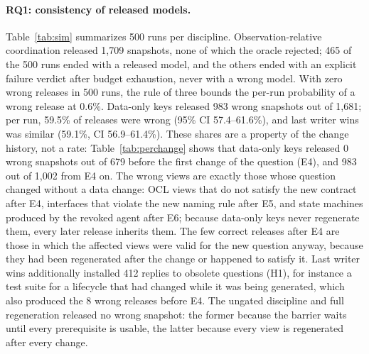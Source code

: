 \documentclass[pdflatex,sn-mathphys-num]{sn-jnl}
\theoremstyle{thmstyleone}%
\theoremstyle{thmstyletwo}%
\theoremstyle{thmstylethree}%
\newcommand{\SimRuns}{500}
\newcommand{\SimExactReleases}{1,709}
\newcommand{\SimDataWrong}{983}
\newcommand{\SimDataReleases}{1,681}
\newcommand{\SimLwwObsolete}{412}
\newcommand{\SimExactFinal}{465}
\newcommand{\SimDataShare}{59.5}
\newcommand{\SimDataShareLo}{57.4}
\newcommand{\SimDataShareHi}{61.6}
\newcommand{\SimLwwShare}{59.1}
\newcommand{\SimLwwShareLo}{56.9}
\newcommand{\SimLwwShareHi}{61.4}
\newcommand{\SimExactBound}{0.6}
\newcommand{\SimDataPreRel}{679}
\newcommand{\SimDataPreWrong}{0}
\newcommand{\SimDataPostRel}{1,002}
\newcommand{\SimDataPostWrong}{983}
\newcommand{\SimLwwPreWrong}{8}
\begin{document}
\paragraph{RQ1: consistency of released models.} Table~\ref{tab:sim} summarizes \SimRuns{} runs per discipline. Observation-relative coordination released \SimExactReleases{} snapshots, none of which the oracle rejected; \SimExactFinal{} of the \SimRuns{} runs ended with a released model, and the others ended with an explicit failure verdict after budget exhaustion, never with a wrong model. With zero wrong releases in \SimRuns{} runs, the rule of three bounds the per-run probability of a wrong release at \SimExactBound\%. Data-only keys released \SimDataWrong{} wrong snapshots out of \SimDataReleases{}; per run, \SimDataShare\% of releases were wrong (95\% CI \SimDataShareLo--\SimDataShareHi\%), and last writer wins was similar (\SimLwwShare\%, CI \SimLwwShareLo--\SimLwwShareHi\%). These shares are a property of the change history, not a rate: Table~\ref{tab:perchange} shows that data-only keys released \SimDataPreWrong{} wrong snapshots out of \SimDataPreRel{} before the first change of the question (E4), and \SimDataPostWrong{} out of \SimDataPostRel{} from E4 on. The wrong views are exactly those whose question changed without a data change: OCL views that do not satisfy the new contract after E4, interfaces that violate the new naming rule after E5, and state machines produced by the revoked agent after E6; because data-only keys never regenerate them, every later release inherits them. The few correct releases after E4 are those in which the affected views were valid for the new question anyway, because they had been regenerated after the change or happened to satisfy it. Last writer wins additionally installed \SimLwwObsolete{} replies to obsolete questions (H1), for instance a test suite for a lifecycle that had changed while it was being generated, which also produced the \SimLwwPreWrong{} wrong releases before E4. The ungated discipline and full regeneration released no wrong snapshot: the former because the barrier waits until every prerequisite is usable, the latter because every view is regenerated after every change.
\end{document}
